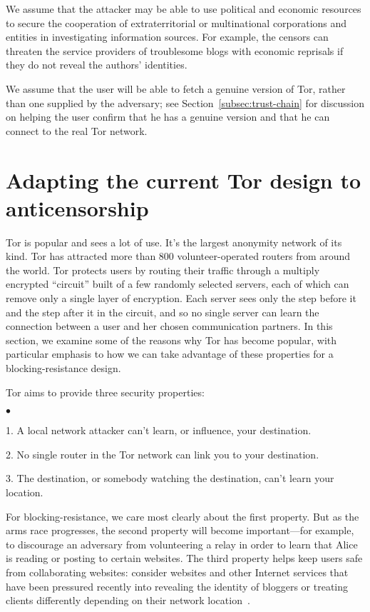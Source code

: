 \documentclass{llncs}
\newenvironment{tightlist}{\begin{list}{$\bullet$}{
  \setlength{\itemsep}{0mm}
    \setlength{\parsep}{0mm}
    }}{\end{list}}
\begin{document}
We assume that the attacker may be able to use political and economic
resources to secure the cooperation of extraterritorial or multinational
corporations and entities in investigating information sources.  For example,
the censors can threaten the service providers of troublesome blogs
with economic
reprisals if they do not reveal the authors' identities.

We assume that the user will be able to fetch a genuine
version of Tor, rather than one supplied by the adversary; see
Section~\ref{subsec:trust-chain} for discussion on helping the user
confirm that he has a genuine version and that he can connect to the
real Tor network.

\section{Adapting the current Tor design to anticensorship}
\label{sec:current-tor}

Tor is popular and sees a lot of use. It's the largest anonymity
network of its kind.
Tor has attracted more than 800 volunteer-operated routers from around the
world.  Tor protects users by routing their traffic through a multiply
encrypted ``circuit'' built of a few randomly selected servers, each of which
can remove only a single layer of encryption.  Each server sees only the step
before it and the step after it in the circuit, and so no single server can
learn the connection between a user and her chosen communication partners.
In this section, we examine some of the reasons why Tor has become popular,
with particular emphasis to how we can take advantage of these properties
for a blocking-resistance design.

Tor aims to provide three security properties:
\begin{tightlist}
\item 1. A local network attacker can't learn, or influence, your
destination.
\item 2. No single router in the Tor network can link you to your
destination.
\item 3. The destination, or somebody watching the destination,
can't learn your location.
\end{tightlist}

For blocking-resistance, we care most clearly about the first
property. But as the arms race progresses, the second property
will become important---for example, to discourage an adversary
from volunteering a relay in order to learn that Alice is reading
or posting to certain websites. The third property helps keep users safe from
collaborating websites: consider websites and other Internet services 
that have been pressured
recently into revealing the identity of bloggers
or treating clients differently depending on their network
location~\cite{goodell-syverson06}.
\end{document}
